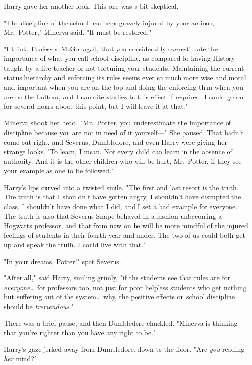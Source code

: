 Harry gave her another look. This one was a bit skeptical.

"The discipline of the school has been gravely injured by your actions, 
Mr.~Potter," Minerva said. "It must be restored."

"I think, Professor McGonagall, that you considerably overestimate the 
importance of what you call school discipline, as compared to having History 
taught by a live teacher or not torturing your students. Maintaining the 
current status hierarchy and enforcing its rules seems ever so much more wise 
and moral and important when you are on the top and doing the enforcing than 
when you are on the bottom, and I can cite studies to this effect if required. 
I could go on for several hours about this point, but I will leave it at that."

Minerva shook her head. "Mr.~Potter, you underestimate the importance of 
discipline because you are not in need of it yourself---" She paused. That 
hadn't come out right, and Severus, Dumbledore, and even Harry were giving her 
strange looks. "To learn, I mean. Not every child can learn in the absence of 
authority. And it is the other children who will be hurt, Mr.~Potter, if they 
see your example as one to be followed."

Harry's lips curved into a twisted smile. "The first and last resort is the 
truth. The truth is that I shouldn't have gotten angry, I shouldn't have 
disrupted the class, I shouldn't have done what I did, and I set a bad example 
for everyone. The truth is also that Severus Snape behaved in a fashion 
unbecoming a Hogwarts professor, and that from now on he will be more mindful 
of the injured feelings of students in their fourth year and under. The two of 
us could both get up and speak the truth. I could live with that."

"In your dreams, Potter!" spat Severus.

"After all," said Harry, smiling grimly, "if the students see that rules are 
for \emph{everyone{\ldots}} for professors too, not just for poor helpless 
students who get nothing but suffering out of the system{\ldots} why, the 
positive effects on school discipline should be \emph{tremendous.}"

There was a brief pause, and then Dumbledore chuckled. "Minerva is thinking 
that you're righter than you have any right to be."

Harry's gaze jerked away from Dumbledore, down to the floor. "Are \emph{you} 
reading \emph{her} mind?"


